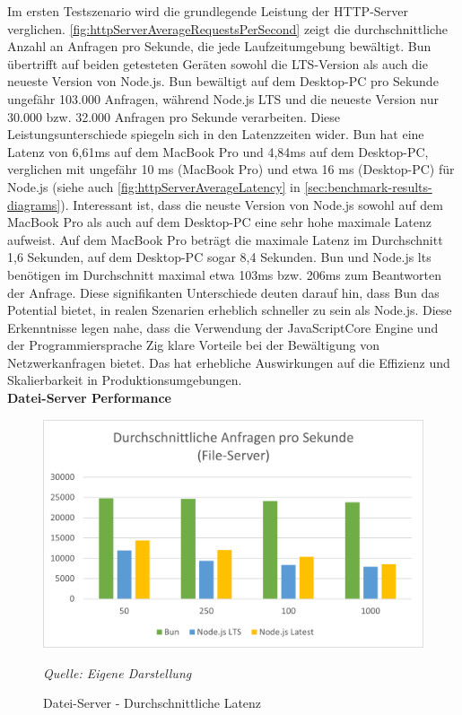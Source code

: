 \noindent
Im ersten Testszenario wird die grundlegende Leistung der HTTP-Server verglichen. \autoref{fig:httpServerAverageRequestsPerSecond} zeigt die durchschnittliche Anzahl an Anfragen pro Sekunde, die jede Laufzeitumgebung bewältigt. Bun übertrifft auf beiden getesteten Geräten sowohl die LTS-Version als auch die neueste Version von Node.js. Bun bewältigt auf dem Desktop-PC pro Sekunde ungefähr 103.000 Anfragen, während Node.js LTS und die neueste Version nur 30.000 bzw. 32.000 Anfragen pro Sekunde verarbeiten. Diese Leistungsunterschiede spiegeln sich in den Latenzzeiten wider. Bun hat eine Latenz von 6,61ms auf dem MacBook Pro und 4,84ms auf dem Desktop-PC, verglichen mit ungefähr 10 ms (MacBook Pro) und etwa 16 ms (Desktop-PC) für Node.js (siehe auch \autoref{fig:httpServerAverageLatency} in \autoref{sec:benchmark-results-diagrams}). Interessant ist, dass die neuste Version von Node.js sowohl auf dem MacBook Pro als auch auf dem Desktop-PC eine sehr hohe maximale Latenz aufweist. Auf dem MacBook Pro beträgt die maximale Latenz im Durchschnitt 1,6 Sekunden, auf dem Desktop-PC sogar 8,4 Sekunden. Bun und Node.js \ac{lts} benötigen im Durchschnitt maximal etwa 103ms bzw. 206ms zum Beantworten der Anfrage.\newline
Diese signifikanten Unterschiede deuten darauf hin, dass Bun das Potential bietet, in realen Szenarien erheblich schneller zu sein als Node.js. Diese Erkenntnisse legen nahe, dass die Verwendung der JavaScriptCore Engine und der Programmiersprache Zig klare Vorteile bei der Bewältigung von Netzwerkanfragen bietet. Das hat erhebliche Auswirkungen auf die Effizienz und Skalierbarkeit in Produktionsumgebungen.\\

\noindent
\textbf{Datei-Server Performance}
\begin{figure}[h!]
	\centering
	\includegraphics[width=\linewidth]{./images/fileServerAverageLatencyDesktop.png}
	\caption{Datei-Server - Durchschnittliche Latenz}
	\label{fig:fileServerAverageLatency}
	\textit{Quelle: Eigene Darstellung}
\end{figure}

